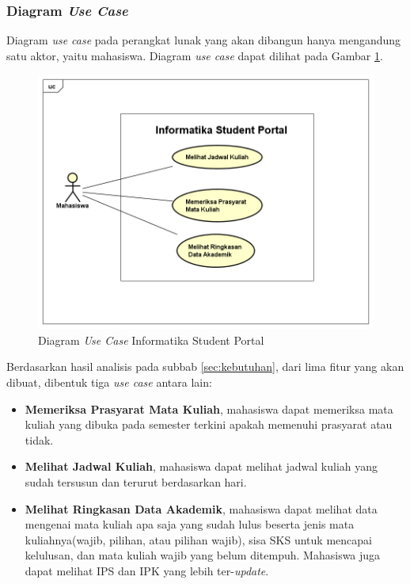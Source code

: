 \subsubsection{Diagram \textit{Use Case}}
Diagram \textit{use case} pada perangkat lunak yang akan dibangun hanya mengandung satu aktor, yaitu mahasiswa. Diagram \textit{use case} dapat dilihat pada Gambar \ref{fig:3_usecase_diagram}. 
		\begin{figure}[H]
			\centering
			\includegraphics[scale=0.5]{Gambar/usecase-diagram}
			\caption{Diagram \textit{Use Case} Informatika Student Portal} 
			\label{fig:3_usecase_diagram}
		\end{figure}
Berdasarkan hasil analisis pada subbab \ref{sec:kebutuhan}, dari lima fitur yang akan dibuat, dibentuk tiga \textit{use case} antara lain:
\begin{itemize}
	\item \textbf{Memeriksa Prasyarat Mata Kuliah}, mahasiswa dapat memeriksa mata kuliah yang dibuka pada semester terkini apakah memenuhi prasyarat atau tidak. 
	\item \textbf{Melihat Jadwal Kuliah}, mahasiswa dapat melihat jadwal kuliah yang sudah tersusun dan terurut berdasarkan hari.
	\item \textbf{Melihat Ringkasan Data Akademik}, mahasiswa dapat melihat data mengenai mata kuliah apa saja yang sudah lulus beserta jenis mata kuliahnya(wajib, pilihan, atau pilihan wajib), sisa SKS untuk mencapai kelulusan, dan mata kuliah wajib yang belum ditempuh. Mahasiswa juga dapat melihat IPS dan IPK yang lebih ter-\textit{update}.
\end{itemize}

